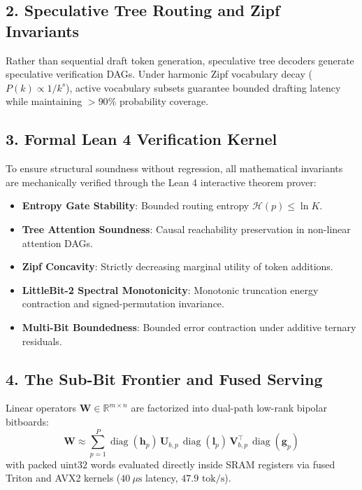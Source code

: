 \documentclass[11pt,a4paper]{article}
\begin{document}
\subsection{2. Speculative Tree Routing and Zipf Invariants}
Rather than sequential draft token generation, speculative tree decoders generate speculative verification DAGs. Under harmonic Zipf vocabulary decay ($P(k) \propto 1/k^s$), active vocabulary subsets guarantee bounded drafting latency while maintaining $>90\%$ probability coverage.

\subsection{3. Formal Lean 4 Verification Kernel}
To ensure structural soundness without regression, all mathematical invariants are mechanically verified through the Lean 4 interactive theorem prover:
\begin{itemize}
    \item \textbf{Entropy Gate Stability}: Bounded routing entropy $\mathcal{H}(p) \le \ln K$.
    \item \textbf{Tree Attention Soundness}: Causal reachability preservation in non-linear attention DAGs.
    \item \textbf{Zipf Concavity}: Strictly decreasing marginal utility of token additions.
    \item \textbf{LittleBit-2 Spectral Monotonicity}: Monotonic truncation energy contraction and signed-permutation invariance.
    \item \textbf{Multi-Bit Boundedness}: Bounded error contraction under additive ternary residuals.
\end{itemize}

\subsection{4. The Sub-Bit Frontier and Fused Serving}
Linear operators $\mathbf{W} \in \mathbb{R}^{m \times n}$ are factorized into dual-path low-rank bipolar bitboards:
\begin{equation}
\mathbf{W} \approx \sum_{p=1}^P \operatorname{diag}(\mathbf{h}_p) \, \mathbf{U}_{b,p} \, \operatorname{diag}(\mathbf{l}_p) \, \mathbf{V}_{b,p}^\top \, \operatorname{diag}(\mathbf{g}_p)
\end{equation}
with packed $\text{uint32}$ words evaluated directly inside SRAM registers via fused Triton and AVX2 kernels ($40\ \mu\text{s}$ latency, $47.9\text{ tok/s}$).
\end{document}
